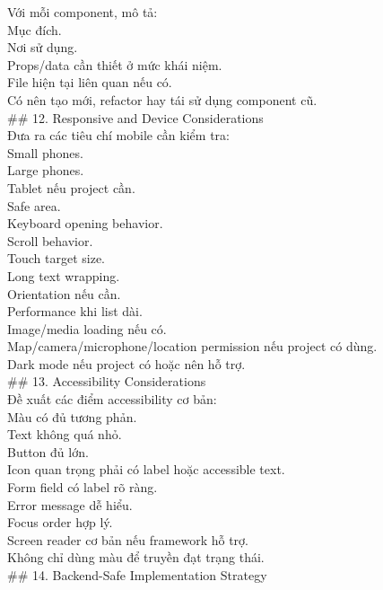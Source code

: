 \begin{enumerate}
Với mỗi component, mô tả: \\
\* Mục đích. \\
\* Nơi sử dụng. \\
\* Props/data cần thiết ở mức khái niệm. \\
\* File hiện tại liên quan nếu có. \\
\* Có nên tạo mới, refactor hay tái sử dụng component cũ. \\


\#\# 12. Responsive and Device Considerations \\

Đưa ra các tiêu chí mobile cần kiểm tra: \\
\* Small phones. \\
\* Large phones. \\
\* Tablet nếu project cần. \\
\* Safe area. \\
\* Keyboard opening behavior. \\
\* Scroll behavior. \\
\* Touch target size. \\
\* Long text wrapping. \\
\* Orientation nếu cần. \\
\* Performance khi list dài. \\
\* Image/media loading nếu có. \\
\* Map/camera/microphone/location permission nếu project có dùng. \\
\* Dark mode nếu project có hoặc nên hỗ trợ. \\


\#\# 13. Accessibility Considerations \\

Đề xuất các điểm accessibility cơ bản: \\
\* Màu có đủ tương phản. \\
\* Text không quá nhỏ. \\
\* Button đủ lớn. \\
\* Icon quan trọng phải có label hoặc accessible text. \\
\* Form field có label rõ ràng. \\
\* Error message dễ hiểu. \\
\* Focus order hợp lý. \\
\* Screen reader cơ bản nếu framework hỗ trợ. \\
\* Không chỉ dùng màu để truyền đạt trạng thái. \\


\#\# 14. Backend-Safe Implementation Strategy \\


\end{enumerate}
